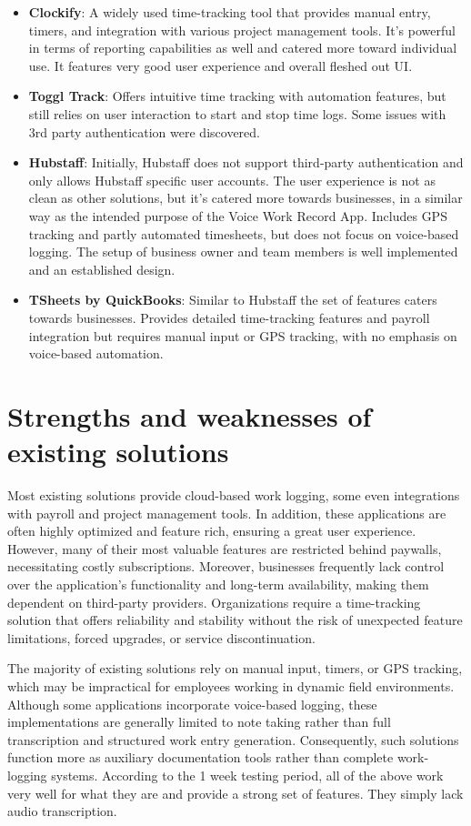 \documentclass[
  digital,     %
  oneside,     %
  nosansbold,  %
  nocolorbold, %
  lof,         %
  lot,         %
]{fithesis4}
\begin{document}
\begin{itemize}
\item \textbf{Clockify}: A widely used time-tracking tool that provides manual entry, timers, and integration with various project management tools. It's powerful in terms of reporting capabilities as well and catered more toward individual use. It features very good user experience and overall fleshed out \gls{UI}.
\item \textbf{Toggl Track}: Offers intuitive time tracking with automation features, but still relies on user interaction to start and stop time logs. Some issues with 3rd party authentication were discovered.
\item \textbf{Hubstaff}: Initially, Hubstaff does not support third-party authentication and only allows Hubstaff specific user accounts. The user experience is not as clean as other solutions, but it's catered more towards businesses, in a similar way as the intended purpose of the Voice Work Record App. Includes \gls{GPS} tracking and partly automated timesheets, but does not focus on voice-based logging. The setup of business owner and team members is well implemented and an established design.
\item \textbf{TSheets by QuickBooks}: Similar to Hubstaff the set of features caters towards businesses. Provides detailed time-tracking features and payroll integration but requires manual input or \gls{GPS} tracking, with no emphasis on voice-based automation.
\end{itemize}

\section{Strengths and weaknesses of existing solutions}

Most existing solutions provide cloud-based work logging, some even integrations with payroll and project management tools. In addition, these applications are often highly optimized and feature rich, ensuring a great user experience. However, many of their most valuable features are restricted behind paywalls, necessitating costly subscriptions. Moreover, businesses frequently lack control over the application's functionality and long-term availability, making them dependent on third-party providers. Organizations require a time-tracking solution that offers reliability and stability without the risk of unexpected feature limitations, forced upgrades, or service discontinuation. 

The majority of existing solutions rely on manual input, timers, or \gls{GPS} tracking, which may be impractical for employees working in dynamic field environments. Although some applications incorporate voice-based logging, these implementations are generally limited to note taking rather than full transcription and structured work entry generation. Consequently, such solutions function more as auxiliary documentation tools rather than complete work-logging systems. According to the 1 week testing period, all of the above work very well for what they are and provide a strong set of features. They simply lack audio transcription.
\end{document}
